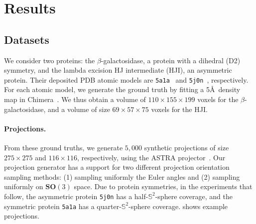 \section{Results}

\subsection{Datasets}\label{sec:results:data}


We consider two proteins: the $\beta$-galactosidase, a protein with a dihedral (D2) symmetry, and the lambda excision HJ intermediate (HJI), an asymmetric protein.
Their deposited PDB atomic models are \texttt{5a1a}~\cite{bartesaghi2015betagal} and \texttt{5j0n}~\cite{laxmikanthan2016structure}, respectively.
For each atomic model, we generate the ground truth by fitting a 5\AA\ density map in Chimera~\cite{pettersen2004ucsf}.
We thus obtain a volume of $110 \times 155 \times 199$ voxels for the $\beta$-galactosidase, and a volume of size $69 \times 57 \times 75$ voxels for the HJI.

\paragraph{Projections.}
From these ground truths, we generate $5,000$ synthetic projections of size $275\times 275$ and $116\times 116$, respectively, using the ASTRA projector~\cite{van2015astra}.
Our projection generator has a support for two different projection orientation sampling methods: (1) sampling uniformly the Euler angles and (2) sampling uniformly on $\textbf{SO}(3)$ space. Due to protein symmetries, in the experiments that follow, the asymmetric protein \texttt{5j0n} has a half-$\mathbb{S}^2$-sphere coverage, and the symmetric protein \texttt{5a1a} has a quarter-$\mathbb{S}^2$-sphere coverage.
 shows example projections.

